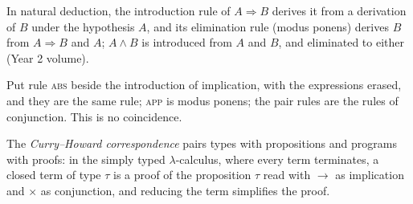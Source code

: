 \begin{recall}
In natural deduction, the introduction rule of $A \Rightarrow B$ derives it from a derivation of $B$ under the hypothesis $A$, and its elimination rule (modus ponens) derives $B$ from $A \Rightarrow B$ and $A$; $A \wedge B$ is introduced from $A$ and $B$, and eliminated to either (Year 2 volume).
\end{recall}

Put rule \textsc{abs} beside the introduction of implication, with the expressions erased, and they are the same rule; \textsc{app} is modus ponens; the pair rules are the rules of conjunction. This is no coincidence.

\begin{definition}\label{def:b3:type-systems:curry-howard}
The \emph{Curry--Howard correspondence} pairs types with propositions and programs with proofs: in the simply typed $\lambda$-calculus, where every term terminates, a closed term of type $\tau$ is a proof of the proposition $\tau$ read with $\to$ as implication and $\times$ as conjunction, and reducing the term simplifies the proof.
\end{definition}

\begin{omfigure}
\par{}
\end{omfigure}

